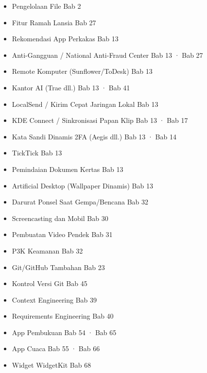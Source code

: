 
\begin{itemize}
  \item Pengelolaan File Bab 2
  \item Fitur Ramah Lansia Bab 27
  \item Rekomendasi App Perkakas Bab 13
  \item Anti-Gangguan / National Anti-Fraud Center Bab 13 · Bab 27
  \item Remote Komputer (Sunflower/ToDesk) Bab 13
  \item Kantor AI (Trae dll.) Bab 13 · Bab 41
  \item LocalSend / Kirim Cepat Jaringan Lokal Bab 13
  \item KDE Connect / Sinkronisasi Papan Klip Bab 13 · Bab 17
  \item Kata Sandi Dinamis 2FA (Aegis dll.) Bab 13 · Bab 14
  \item TickTick Bab 13
  \item Pemindaian Dokumen Kertas Bab 13
  \item Artificial Desktop (Wallpaper Dinamis) Bab 13
  \item Darurat Ponsel Saat Gempa/Bencana Bab 32
  \item Screencasting dan Mobil Bab 30
  \item Pembuatan Video Pendek Bab 31
  \item P3K Keamanan Bab 32
  \item Git/GitHub Tambahan Bab 23
  \item Kontrol Versi Git Bab 45
  \item Context Engineering Bab 39
  \item Requirements Engineering Bab 40
  \item App Pembukuan Bab 54 · Bab 65
  \item App Cuaca Bab 55 · Bab 66
  \item Widget WidgetKit Bab 68
\end{itemize}

